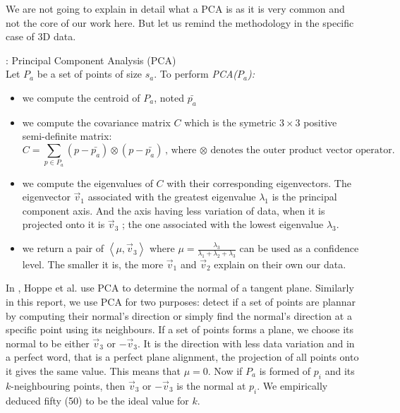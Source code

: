 We are not going to explain in detail what a PCA is as it is very common and not the core of our work here. But let us remind the methodology in the specific case of 3D data.

\begin{definition}{: Principal Component Analysis (PCA)}
\\ Let $P_a$ be a set of points of size $s_a$. To perform \textit{PCA($P_a$):}
\begin{itemize}
\item we compute the centroid of $P_a$, noted $\bar{p_a}$
\item we compute the covariance matrix $C$ which is the symetric $3 \times 3$ positive semi-definite matrix:
\begin{equation*}
C = \sum_{p \in P_a} (p - \bar{p_a}) \otimes (p - \bar{p_a}) \text{,       where $\otimes$ denotes the outer product vector operator.}
\end{equation*}
\item we compute the eigenvalues of $C$ with their corresponding eigenvectors. The eigenvector $\vec{v}_1$  associated with the greatest eigenvalue $\lambda_1$  is the principal component axis. And the axis having less variation of data, when it is projected onto it is $\vec{v}_3$ ; the one associated with the lowest eigenvalue $\lambda_3$.
\item we return a pair of $\left\langle \mu, \vec{v}_3 \right\rangle$ where $\mu = \frac{\lambda_3}{\lambda_1 + \lambda_2 + \lambda_3}$ can be used as a confidence level. The smaller it is, the more $\vec{v}_1$ and $\vec{v}_2$  explain on their own our data.
\end{itemize}
\end{definition}

In \cite{hoppe}, Hoppe et al. use PCA to determine the normal of a tangent plane. Similarly in this report, we use PCA for two purposes: detect if a set of points are plannar by computing their normal's direction or simply find the normal's direction at a specific point using its neighbours. If a set of points forms a plane, we choose its normal to be either $\vec{v}_3$ or $-\vec{v}_3$. It is the direction with less data variation and in a perfect word, that is a perfect plane alignment, the projection of all points onto it gives the same value. This means that  $\mu = 0$. Now if $P_a$ is formed of $p_i$ and its $k$-neighbouring points, then $\vec{v}_3$ or $-\vec{v}_3$ is the normal at $p_i$. We empirically deduced fifty (50) to be the ideal value for $k$.


